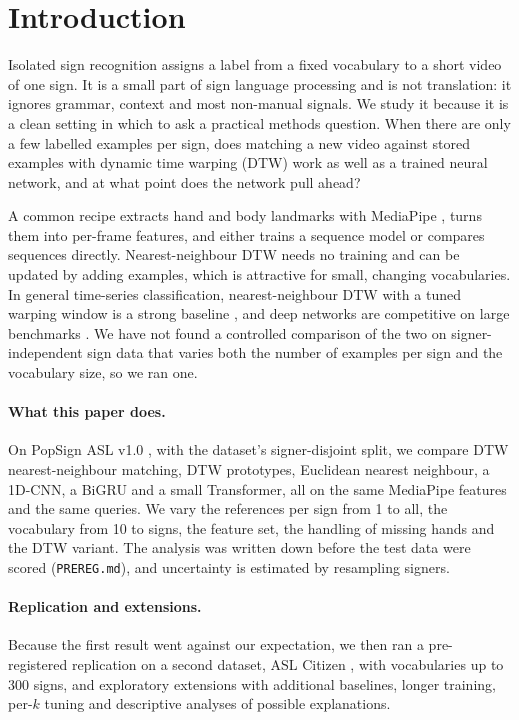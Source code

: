 \section{Introduction}
Isolated sign recognition assigns a label from a fixed vocabulary to a short video of one sign. It is a small part of sign
language processing and is not translation: it ignores grammar, context and most non-manual signals. We study it because
it is a clean setting in which to ask a practical methods question. When there are only a few labelled examples per sign,
does matching a new video against stored examples with dynamic time warping (DTW) work as well as a trained neural
network, and at what point does the network pull ahead?

A common recipe extracts hand and body landmarks with MediaPipe \citep{lugaresi2019mediapipe,zhang2020mphands}, turns them
into per-frame features, and either trains a sequence model or compares sequences directly. Nearest-neighbour DTW needs no
training and can be updated by adding examples, which is attractive for small, changing vocabularies. In general time-series
classification, nearest-neighbour DTW with a tuned warping window is a strong baseline \citep{bagnall2014nn}, and deep
networks are competitive on large benchmarks \citep{fawaz2019dl}. We have not found a controlled comparison of the two on
signer-independent sign data that varies both the number of examples per sign and the vocabulary size, so we ran one.

\paragraph{What this paper does.} On PopSign ASL v1.0 \citep{starner2023popsign}, with the dataset's signer-disjoint
split, we compare DTW nearest-neighbour matching, DTW prototypes, Euclidean nearest neighbour, a 1D-CNN, a BiGRU and a small
Transformer, all on the same MediaPipe features and the same queries. We vary the references per sign from 1 to all, the
vocabulary from 10 to \nVocabMax{} signs, the feature set, the handling of missing hands and the DTW variant. The analysis was
written down before the test data were scored (\texttt{PREREG.md}), and uncertainty is estimated by resampling signers.

\paragraph{Replication and extensions.} Because the first result went against our expectation, we then ran a pre-registered replication on a second
dataset, ASL Citizen \citep{desai2023aslcitizen}, with vocabularies up to 300 signs, and exploratory extensions with additional baselines,
longer training, per-$k$ tuning and descriptive analyses of possible explanations.

